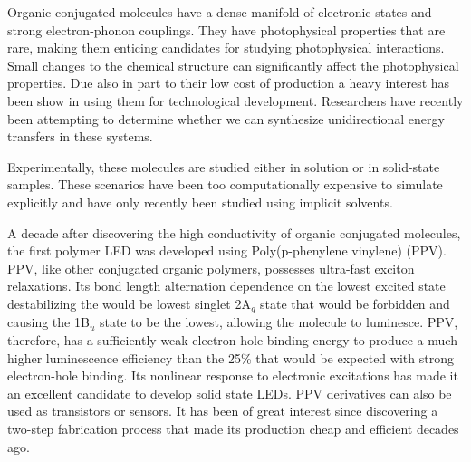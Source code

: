 Organic conjugated molecules have a dense manifold of electronic states and strong electron-phonon couplings.\cite{tretiak2002conformational,nelson2011nonadiabatic,nelson2014nonadiabatic}
They have photophysical properties that are rare, making them enticing candidates for studying photophysical interactions. \cite{bredas1999excited,spano2000emission}
Small changes to the chemical structure can significantly affect the photophysical properties.\cite{andre1991quantum}
Due also in part to their low cost of production a heavy interest has been show in using them for technological development.\cite{granstrom1998laminated,cao1999improved,sirringhaus2000high,bredas2004charge,bredas2009excitons,bredas2009molecular,collini2009coherent}
Researchers have recently been attempting to determine whether we can synthesize unidirectional energy transfers in these systems.\cite{soler2012analysis,soler2014signature,Galindo2015,FernandezAlberti2010,FernandezAlberti2012}

Experimentally, these molecules are studied either in solution or in solid-state samples.
These scenarios have been too computationally expensive to simulate explicitly and have only recently been studied using implicit solvents.\cite{sifain2018photoexcited}

A decade after discovering the high conductivity of organic conjugated molecules, the first polymer LED was developed using Poly(p-phenylene vinylene) (PPV).\cite{brown1992poly}
PPV, like other conjugated organic polymers, possesses ultra-fast exciton relaxations.
Its bond length alternation dependence on the lowest excited state destabilizing the would be lowest singlet 2A\(_g\) state that would be forbidden and causing the 1B\(_u\) state to be the lowest, allowing the molecule to luminesce.\cite{soos1993band}
PPV, therefore, has a sufficiently weak electron-hole binding energy to produce a much higher luminescence efficiency than the 25\% that would be expected with strong electron-hole binding. \cite{cao1999improved}
Its nonlinear response to electronic excitations has made it an excellent candidate to develop solid state LEDs. \cite{burroughes1990light,gustafsson1993plastic,friend1997electronic}
PPV derivatives can also be used as transistors or sensors.\cite{willander1993polymer,partridge1996high}
It has been of great interest since discovering a two-step fabrication process that made its production cheap and efficient decades ago.\cite{gagnon1987synthesis}


